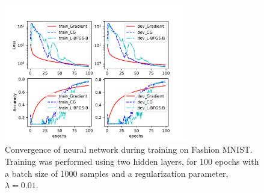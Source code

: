 \documentclass[11pt,twocolumn]{article}
\begin{document}
\begin{figure}[!ht]
\centering
\includegraphics[height=6cm, width=8cm]{../src-mnist/compare_solvers_nL_2_nepoch_100_reg_0pt01_lr_0pt4.pdf}
\caption{Convergence of neural network during training on Fashion MNIST. Training was performed using two hidden layers, for 100 epochs with a batch size of 1000 samples and a regularization parameter, $\lambda=0.01$.}\label{NN_2layer}
\end{figure}

\newpage

%
%
\end{document}
